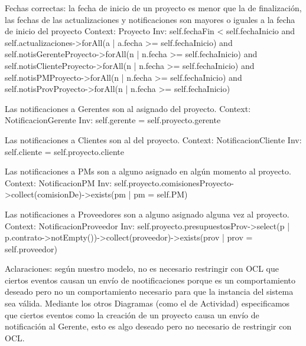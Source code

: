 \begin{listocl}

\begin{itemocl}{Fechas correctas: la fecha de inicio de un proyecto es menor que la de finalización, las fechas de las actualizaciones y notificaciones son mayores o iguales a la fecha de inicio del proyecto}
Context: Proyecto
Inv: self.fechaFin < self.fechaInicio and self.actualizaciones->forAll(a | a.fecha >= self.fechaInicio) and self.notisGerenteProyecto->forAll(n | n.fecha >= self.fechaInicio) and self.notisClienteProyecto->forAll(n | n.fecha >= self.fechaInicio) and self.notisPMProyecto->forAll(n | n.fecha >= self.fechaInicio) and self.notisProvProyecto->forAll(n | n.fecha >= self.fechaInicio)
\end{itemocl}


\begin{itemocl}{Las notificaciones a Gerentes son al asignado del proyecto.}
Context: NotificacionGerente
Inv: self.gerente = self.proyecto.gerente
\end{itemocl}

\begin{itemocl}{Las notificaciones a Clientes son al del proyecto.}
Context: NotificacionCliente
Inv: self.cliente = self.proyecto.cliente
\end{itemocl}

\begin{itemocl}{Las notificaciones a PMs son a alguno asignado en algún momento al proyecto.}
Context: NotificacionPM
Inv: self.proyecto.comisionesProyecto->collect(comisionDe)->exists(pm | pm = self.PM)
\end{itemocl}

\begin{itemocl}{Las notificaciones a Proveedores son a alguno asignado alguna vez al proyecto.}
Context: NotificacionProveedor
Inv: self.proyecto.presupuestosProv->select(p | p.contrato->notEmpty())->collect(proveedor)->exists(prov | prov = self.proveedor)
\end{itemocl}

\end{listocl}

Aclaraciones: según nuestro modelo, no es necesario restringir con OCL que ciertos eventos causan un envío de nootificaciones porque es un comportamiento deseado pero no un comportamiento necesario para que la instancia del sistema sea válida. Mediante los otros Diagramas (como el de Actividad) especificamos que ciertos eventos como la creación de un proyecto causa un envío de notificación al Gerente, esto es algo deseado pero no necesario de restringir con OCL.
